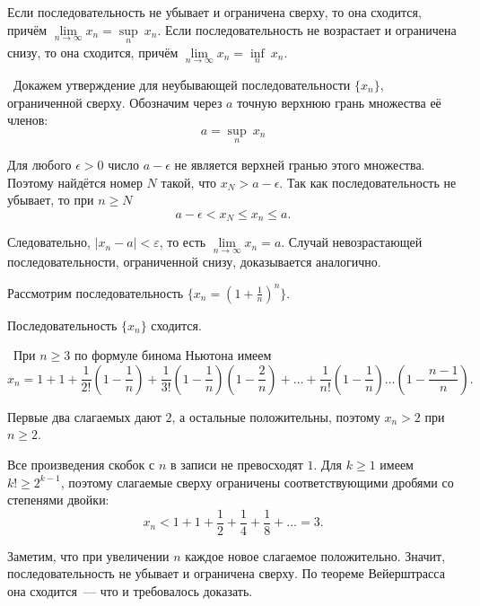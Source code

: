 \begin{theorem}
Если последовательность не убывает и ограничена сверху, то она
сходится, причём \(\lim\limits_{ n \to \infty }{x_{n}} = \underset{n}{\sup} ~ x_{n}\).
Если последовательность не возрастает и ограничена снизу, то
она сходится, причём \(\lim\limits_{ n \to \infty }{x_{n}} = \underset{n}{\inf} ~ x_{n}.\)

\vspace{2mm}

\proofname~Докажем утверждение для неубывающей последовательности
\(\{x_{n}\}\), ограниченной сверху. Обозначим через \(a\) точную
верхнюю грань множества её членов:
\[
a = \underset{n}{\sup} ~ x_{n}
\]

Для любого \(\epsilon > 0\) число \(a-\epsilon\) не является
верхней гранью этого множества. Поэтому найдётся номер \(N\) такой,
что \(x_{N} > a - \epsilon\). Так как последовательность не убывает, то при \(n \geq N\)
\[
a - \epsilon < x_{N} \leq x_{n} \leq a.
\]

Следовательно, \(|x_{n}-a|<\varepsilon\), то есть \(\lim\limits_{n \to \infty} x_{n} = a\).
Случай невозрастающей последовательности, ограниченной снизу,
доказывается аналогично.~\qedsymbol
\end{theorem}


Рассмотрим последовательность
\(\{x_{n}=\left(1 + \frac{1}{n}\right)^{n}\}\).

\begin{theorem}
Последовательность \(\{x_{n}\}\) сходится.

\vspace{2mm}

\proofname~При \(n \geq 3\) по формуле бинома Ньютона имеем
\[
x_{n} = 1 + 1 + \frac{1}{2!}\left(1 - \frac{1}{n}\right)
+ \frac{1}{3!}\left(1 - \frac{1}{n}\right)
\left(1 - \frac{2}{n}\right) + \dots +
\frac{1}{n!}\left(1 - \frac{1}{n}\right) \dots
\left(1 - \frac{n-1}{n}\right).
\]

Первые два слагаемых дают \(2\), а остальные положительны, поэтому
\(x_{n} > 2\) при \(n \geq 2\).

Все произведения скобок с \(n\) в записи не превосходят \(1\). Для \(k \geq 1\)
имеем \(k! \geq 2^{k-1}\), поэтому слагаемые сверху ограничены
соответствующими дробями со степенями двойки:
\[
x_{n} < 1 + 1 + \frac{1}{2} + \frac{1}{4} + \frac{1}{8} + \dots = 3.
\]

\indent Заметим, что при увеличении \(n\) каждое новое слагаемое положительно.
Значит, последовательность не убывает и ограничена сверху.
По теореме Вейерштрасса она сходится~--- что и требовалось доказать.~\qedsymbol
\end{theorem}

